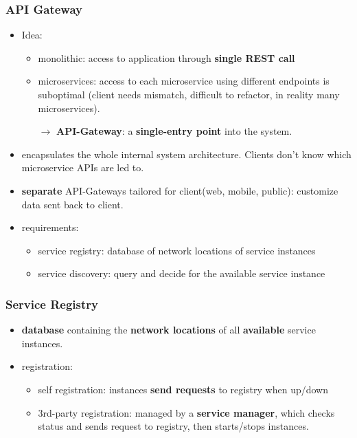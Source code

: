\subsubsection{API Gateway}
\begin{itemize}
	\item Idea: 
	\begin{itemize}
		\item monolithic: access to application through \textbf{single REST call}
		\item microservices: access to each microservice using different endpoints is suboptimal (client needs mismatch, difficult to refactor, in reality many microservices).
		
		$\rightarrow$ \textbf{API-Gateway}: a \textbf{single-entry point} into the system.	
	\end{itemize}
	\item encapsulates the whole internal system architecture. Clients don't know which microservice APIs are led to. 
	\item \textbf{separate} API-Gateways tailored for client(web, mobile, public): customize data sent back to client.
	\item requirements: 
	\begin{itemize}
		\item service registry: database of network locations of service instances
		\item service discovery: query and decide for the available service instance
	\end{itemize}

\end{itemize}

\subsubsection{Service Registry}
\begin{itemize}
	\item \textbf{database} containing the \textbf{network locations} of all \textbf{available} service instances. 
	\item registration:
	\begin{itemize}
		\item self registration: instances \textbf{send requests} to registry when up/down
		\item 3rd-party registration: managed by a \textbf{service manager}, which checks status and sends request to registry, then starts/stops instances.
	\end{itemize}
\end{itemize}

